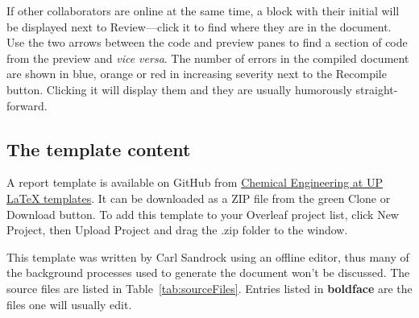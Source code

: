 \documentclass[a4paper,12pt]{article}
\begin{document}
If other collaborators are online at the same time, a block with their initial will be displayed next to Review---click it to find where they are in the document. Use the two arrows between the code and preview panes to find a section of code from the preview and \textit{vice versa}. The number of errors in the compiled document are shown in blue, orange or red in increasing severity next to the Recompile button. Clicking it will display them and they are usually humorously straight-forward.


\subsection{The template content}
A report template is available on GitHub from \href{https://github.com/ ChemEngUP/ce-up-latex-templates}{Chemical Engineering at UP LaTeX templates}. It can be downloaded as a ZIP file from the green Clone or Download button. To add this template to your Overleaf project list, click New Project, then Upload Project and drag the .zip folder to the window.

This template was written by Carl Sandrock using an offline editor, thus many of the background processes used to generate the document won't be discussed. The source files are listed in Table~\ref{tab:sourceFiles}. Entries listed in \textbf{boldface} are the files one will usually edit. 
\end{document}
